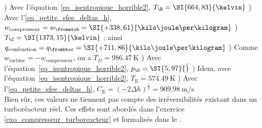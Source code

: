 \begin{description}
						) Avec l’équation~\ref{eq_isentropique_horrible2}, $T_\B = \SI{664,83}{\kelvin}$
						) Avec l’\cref{eq_petite_sfee_deltas_h}, $w_\text{compresseur} = w_\fromatob = \SI{+338,61}{\kilo\joule\per\kilogram}$
						) $T_\C = \SI{1373,15}{\kelvin}$ ; ainsi $q_\text{combustion} = q_\frombtoc = \SI{+711,86}{\kilo\joule\per\kilogram}$
						) Comme $w_\text{turbine} = - w_\text{compresseur}$, on a $T_D = \SI{986,47}{\kelvin}$
						) Avec l’équation~\ref{eq_isentropique_horrible2}, $p_\D = \SI{5,97}{\bar}$
						) Idem, avec l’équation~\ref{eq_isentropique_horrible2}, $T_\text{E} = \SI{574,49}{\kelvin}$
						) Avec l’\cref{eq_petite_sfee_deltas_h}, $C_\text{E} = \left(-2\Delta h\right)^\frac{1}{2} = \SI{909,98}{\metre\per\second}$\\
						\tab Bien sûr, ces valeurs ne tiennent pas compte des irréversibilités existant dans un turboréacteur réel. Ces effets sont abordés dans l’exercice \ref{exo_compresseur_turboreacteur} et formalisés dans le \coursdix.
\end{description}
